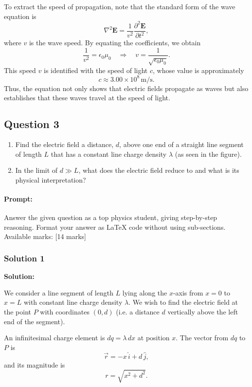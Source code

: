 \documentclass{article}
\begin{document}
To extract the speed of propagation, note that the standard form of the wave equation is 
\[
\nabla^2 \mathbf{E} = \frac{1}{v^2}\frac{\partial^2 \mathbf{E}}{\partial t^2},
\]
where \(v\) is the wave speed. By equating the coefficients, we obtain 
\[
\frac{1}{v^2} = \epsilon_0 \mu_0 \quad \Rightarrow \quad v = \frac{1}{\sqrt{\epsilon_0 \mu_0}}.
\]
This speed \(v\) is identified with the speed of light \(c\), whose value is approximately 
\[
c \approx 3.00 \times 10^8 \, \text{m/s}.
\]
Thus, the equation not only shows that electric fields propagate as waves but also establishes that these waves travel at the speed of light.


\subsection{Question 3}
\begin{enumerate}
    \item Find the electric field a distance, \( d \), above one end of a straight line segment of length \( L \) that has a constant line charge density \( \lambda \) (as seen in the figure).
    \item In the limit of \( d \gg L \), what does the electric field reduce to and what is its physical interpretation?
\end{enumerate}


\paragraph{Prompt: \\} 
Answer the given question as a top physics student, giving step-by-step reasoning. Format your answer as LaTeX code without using sub-sections. Available marks: [14 marks]

\subsubsection{Solution 1}
\textbf{Solution:}

We consider a line segment of length \(L\) lying along the \(x\)-axis from \(x=0\) to \(x=L\) with constant line charge density \(\lambda\). We wish to find the electric field at the point \(P\) with coordinates \((0,d)\) (i.e. a distance \(d\) vertically above the left end of the segment).

An infinitesimal charge element is \(dq=\lambda\,dx\) at position \(x\). The vector from \(dq\) to \(P\) is 
\[
\vec{r} = -x\,\hat{i} + d\,\hat{j},
\]
and its magnitude is 
\[
r=\sqrt{x^2+d^2}.
\]
\end{document}
